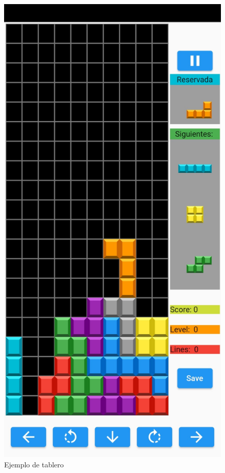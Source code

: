 \documentclass{article}
\begin{document}
\begin{figure}[H]
\center
        \includegraphics[scale=0.3]{imagenes/captura1.jpeg}
        \caption{Ejemplo de tablero}
\end{figure}
\end{document}

